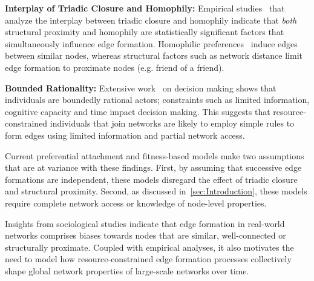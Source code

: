\textbf{Interplay of Triadic Closure and Homophily:}
Empirical studies~\cite{35626,block2014multidimensional} that analyze the
interplay between triadic closure and homophily
  indicate
that \textit{both} structural proximity and homophily are statistically
significant factors that simultaneously influence edge formation.
Homophilic preferences~\cite{mcpherson2001birds} induce edges between similar
nodes, whereas structural factors such as network distance limit
edge formation to proximate nodes (e.g. friend of a
friend).

\textbf{Bounded Rationality:}
Extensive work~\cite{simon1972theories,gigerenzer1996reasoning,lipman1995information} on
decision making shows that individuals are boundedly rational
actors; constraints such as limited information, cognitive capacity and time impact decision making.
This suggests that resource-constrained individuals that join networks are likely to employ simple rules
to form edges using limited information and partial network access.

Current preferential attachment and fitness-based models
\cite{dorogovtsev2000structure,singh2017relay,barabasi1999emergence}
make two assumptions that are at variance with these findings.
First, by assuming that successive edge formations are independent,
these models disregard the effect of triadic closure and structural proximity.
Second, as discussed in~\cref{sec:Introduction}, these models require complete network
access or knowledge of node-level properties.

Insights from sociological studies indicate that edge formation in real-world
networks comprises biases towards nodes that are similar, well-connected or
structurally proximate. Coupled with empirical analyses, it also motivates
the need to model how resource-constrained edge formation processes collectively
shape global network properties of large-scale networks over time.



